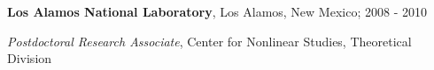 {\bf Los Alamos National Laboratory}, Los Alamos, New Mexico; 2008 - 2010
\begin{list1}
\item[] {\em Postdoctoral Research Associate}, Center for Nonlinear Studies, Theoretical Division
\end{list1}

